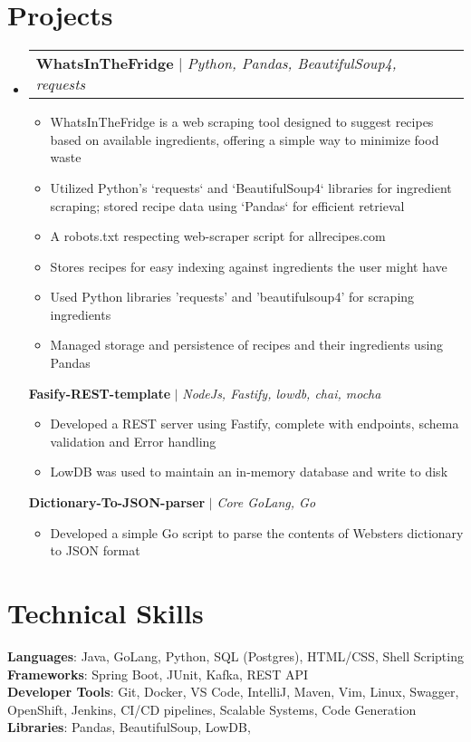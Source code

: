\documentclass[letterpaper,11pt]{article}
\makeatletter
\newcommand{\resumeItem}[1]{
  \item\small{
    {#1 \vspace{-2pt}}
  }
}
\newcommand{\resumeProjectHeading}[2]{
    \item
    \begin{tabular*}{0.97\textwidth}{l@{\extracolsep{\fill}}r}
      \small#1 & #2 \\
    \end{tabular*}\vspace{-7pt}
}
\newcommand{\resumeSubHeadingListStart}{\begin{itemize}[leftmargin=0.15in, label={}]}
\newcommand{\resumeSubHeadingListEnd}{\end{itemize}}
\newcommand{\resumeItemListStart}{\begin{itemize}\vspace{0pt}}
\newcommand{\resumeItemListEnd}{\end{itemize}\vspace{0pt}}
\makeatother
\begin{document}
\section{Projects}
    \resumeSubHeadingListStart
      \resumeProjectHeading
        {\textbf{WhatsInTheFridge{\vspace{5pt}}} $|$ \emph{Python, Pandas, BeautifulSoup4, requests}}{}
          \resumeItemListStart
          \resumeItem{WhatsInTheFridge is a web scraping tool designed to suggest recipes based on available ingredients, offering a simple way to minimize food waste}
            \resumeItem{Utilized Python's `requests` and `BeautifulSoup4` libraries for ingredient scraping; stored recipe data using `Pandas` for efficient retrieval}
            \resumeItem{A robots.txt respecting web-scraper script for allrecipes.com}
            \resumeItem{Stores recipes for easy indexing against ingredients the user might have}
            \resumeItem{Used Python libraries 'requests' and 'beautifulsoup4' for scraping ingredients}
            \resumeItem{Managed storage and persistence of recipes and their ingredients using Pandas}
          \resumeItemListEnd
        {\textbf{Fasify-REST-template} $|$ \emph{NodeJs, Fastify, lowdb, chai, mocha}}{}
          \resumeItemListStart
            \resumeItem{Developed a REST server using Fastify, complete with endpoints, schema validation and Error handling}
            \resumeItem{LowDB was used to maintain an in-memory database and write to disk}
          \resumeItemListEnd
        {\textbf{Dictionary-To-JSON-parser} $|$ \emph{Core GoLang, Go}}{}
          \resumeItemListStart
            \resumeItem{Developed a simple Go script to parse the contents of Websters dictionary to JSON format}
          \resumeItemListEnd
    \resumeSubHeadingListEnd



%
\section{Technical Skills}
 \begin{itemize}[leftmargin=0.15in, label={}]
    \small{\item{
     \textbf{Languages}{: Java, GoLang, Python, SQL (Postgres), HTML/CSS, Shell Scripting} \\
     \textbf{Frameworks}{: Spring Boot, JUnit, Kafka, REST API} \\
     \textbf{Developer Tools}{: Git, Docker, VS Code, IntelliJ, Maven, Vim, Linux, Swagger, OpenShift, Jenkins, CI/CD pipelines, Scalable Systems, Code Generation} \\
     \textbf{Libraries}{: Pandas, BeautifulSoup, LowDB, }
    }}
 \end{itemize}
\end{document}
